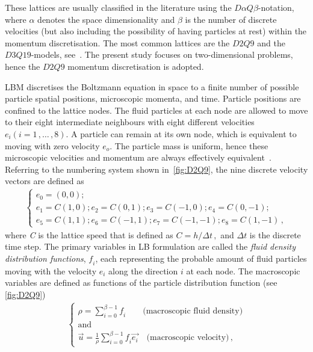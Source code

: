 These lattices are usually classified in the literature using the 
$\mathit{D}\alpha\mathit{Q}\beta$-notation, where $\alpha$ denotes the space 
dimensionality and $\beta$ is the number of discrete velocities (but also 
including the possibility of having particles at rest) within the momentum 
discretisation. The most common lattices are the $\mathit{D2Q9}$ and the 
$\mathit{D3Q19}$-models, see~\citet{He1997}. The present study focuses on 
two-dimensional problems, hence the $\mathit{D2Q9}$ momentum discretisation is 
adopted.

LBM discretises the Boltzmann equation in space to a finite number of possible 
particle spatial positions, microscopic momenta, and time. Particle positions 
are confined to the lattice nodes. The fluid particles at each node are 
allowed to move to their eight intermediate neighbours with eight different 
velocities $\mathit{e_i} (\mathit{i}=1\,,\dots\,,8)$. A particle can remain at 
its own node, which is equivalent to moving with zero velocity $\mathit{e_o}$. 
The particle mass is uniform, hence these microscopic velocities and momentum 
are always effectively equivalent~\citep{Han2007a}. Referring to the numbering 
system shown in~\cref{fig:D2Q9}, the nine discrete velocity vectors are 
defined as
%
\begin{align} 
	\begin{cases}
	\mathit{e_0}=(0,0);\\
	\mathit{e_1}=\mathit{C}(1,0); \mathit{e_2}=\mathit{C}(0,1); 
	\mathit{e_3}=\mathit{C}(-1,0); \mathit{e_4}=\mathit{C}(0,-1); \\
	\mathit{e_5}=\mathit{C}(1,1); \mathit{e_6}=\mathit{C}(-1,1);  
	\mathit{e_7}=\mathit{C}(-1,-1); \mathit{e_8}=\mathit{C}(1,-1)\,, 
	\end{cases}
\end{align}
%
\noindent where \textit{C} is the lattice speed that is defined as 
$\mathit{C}=\mathit{h}/\Delta t \,,$ and $\Delta \mathit{t}$ is the discrete 
time step. The primary variables in LB formulation are called the \textit{fluid 
density distribution functions}, $\mathit{f_i}$, each representing the probable 
amount of fluid particles moving with the velocity $\mathit{e_i}$ along the 
direction $\mathit{i}$ at each node. The macroscopic variables are defined 
as functions of the particle distribution function (see \cref{fig:D2Q9})
%
\begin{align} 
	\label{eq:lbm_macroscopic}	
	\begin{cases}
	\rho = \sum\limits_{\mathit{i}=0}^{\beta - 1}{\mathit{f_i}} \qquad 
	\mbox{(macroscopic fluid density)} \\ 
	\mbox{and}\\
	\overrightarrow{\mathit{u}} = \frac{1}{\rho} 
	\sum\limits_{\mathit{i}=0}^{\beta 
	-1}{\mathit{f_i}\overrightarrow{\mathit{e_i}}} \quad \mbox{(macroscopic 
	velocity)}\,,
	\end{cases}	
\end{align} 
